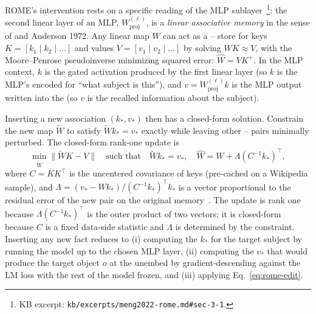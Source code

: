 ROME's intervention rests on a specific reading of the MLP
sublayer~\citep[\S 3.1]{meng2022-rome}\footnote{KB excerpt:
\nolinkurl{kb/excerpts/meng2022-rome.md#sec-3-1}.}: the second linear
layer of an MLP, $W^{(\ell)}_{\mathrm{proj}}$, is a \emph{linear
associative memory} in the sense of \citet{kohonen1972-associative}
and Anderson 1972. Any linear map $W$ can act as a -- store for
keys $K = [k_1 \mid k_2 \mid \ldots]$ and values $V = [v_1 \mid v_2 \mid
\ldots]$ by solving $W K \approx V$, with the Moore--Penrose
pseudoinverse minimizing squared error: $\hat{W} = V K^{+}$. In the MLP
context, $k$ is the gated activation produced by the first linear
layer (so $k$ is the MLP's encoded  for ``what subject is this''),
and $v = W^{(\ell)}_{\mathrm{proj}} k$ is the MLP output written into
the  (so $v$ is the recalled information about the
subject).

Inserting a new association $(k_*, v_*)$ then has a closed-form
solution. Constrain the new map $\tilde{W}$ to satisfy
$\tilde{W} k_* = v_*$ exactly while leaving other -- pairs
minimally perturbed. The closed-form rank-one update
\citep[\S 3.1, Eq.~2]{meng2022-rome} is
\begin{equation}
  \min_{\tilde{W}} \|\tilde{W} K - V\|
  \quad \text{such that} \quad
  \tilde{W} k_* = v_*,
  \quad
  \hat{W} = W + \Lambda (C^{-1} k_*)^\top,
  \label{eq:rome-edit}
\end{equation}
where $C = K K^\top$ is the uncentered covariance of keys (pre-cached
on a Wikipedia sample), and $\Lambda = (v_* - W k_*) / (C^{-1}
k_*)^{\top} k_*$ is a vector proportional to the residual error of the
new pair on the original memory~\citep[\S 3.1]{meng2022-rome}. The
update is rank one because $\Lambda (C^{-1} k_*)^{\top}$ is the outer
product of two vectors; it is closed-form because $C$ is a fixed
data-side statistic and $\Lambda$ is determined by the constraint.
Inserting any new fact reduces to (i) computing the  $k_*$ for the
target subject by running the model up to the chosen MLP layer,
(ii) computing the  $v_*$ that would produce the target object
$o$ at the unembed by gradient-descending against the LM loss with
the rest of the model frozen, and (iii) applying
Eq.~\eqref{eq:rome-edit}.

